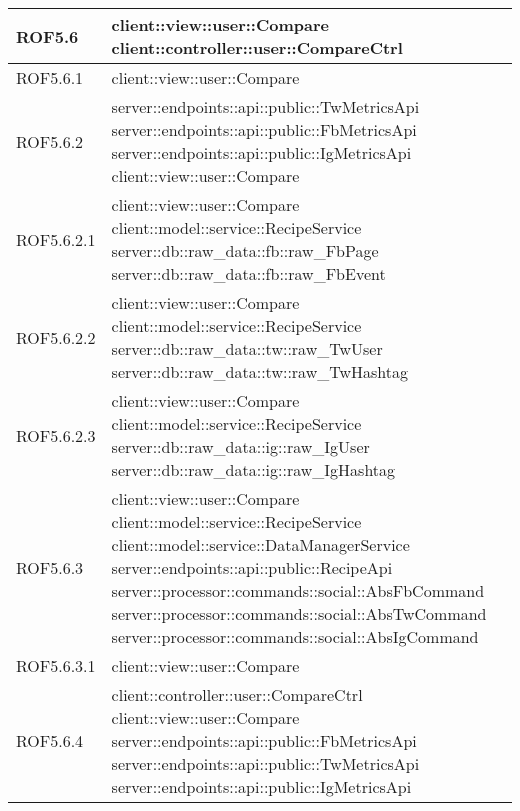 \begin{center}
\begin{longtable}{| p{2.5cm} | p{11cm} |}
\hline
ROF5.6 & client::view::user::Compare \newline client::controller::user::CompareCtrl \\
\hline
ROF5.6.1 & client::view::user::Compare \\
\hline
ROF5.6.2 & server::endpoints::api::public::TwMetricsApi \newline server::endpoints::api::public::FbMetricsApi \newline server::endpoints::api::public::IgMetricsApi \newline client::view::user::Compare \\
\hline
ROF5.6.2.1 & client::view::user::Compare \newline client::model::service::RecipeService \newline server::db::raw\_data::fb::raw\_FbPage \newline server::db::raw\_data::fb::raw\_FbEvent \\
\hline
ROF5.6.2.2 & client::view::user::Compare \newline client::model::service::RecipeService \newline server::db::raw\_data::tw::raw\_TwUser \newline server::db::raw\_data::tw::raw\_TwHashtag \\
\hline
ROF5.6.2.3 & client::view::user::Compare \newline client::model::service::RecipeService \newline server::db::raw\_data::ig::raw\_IgUser \newline server::db::raw\_data::ig::raw\_IgHashtag \\
\hline
ROF5.6.3 & client::view::user::Compare \newline client::model::service::RecipeService \newline client::model::service::DataManagerService \newline server::endpoints::api::public::RecipeApi \newline server::processor::commands::social::AbsFbCommand \newline server::processor::commands::social::AbsTwCommand \newline server::processor::commands::social::AbsIgCommand\\
\hline
ROF5.6.3.1 & client::view::user::Compare \\
\hline
ROF5.6.4 & client::controller::user::CompareCtrl \newline client::view::user::Compare \newline server::endpoints::api::public::FbMetricsApi \newline server::endpoints::api::public::TwMetricsApi \newline server::endpoints::api::public::IgMetricsApi \\

\end{longtable}
\end{center}
